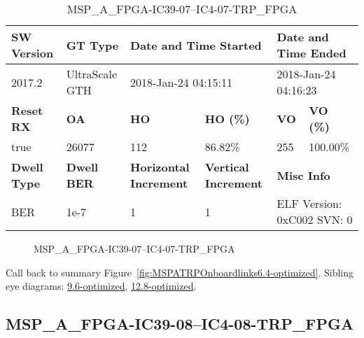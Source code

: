 \begin{table}[h]
\centering
\caption{MSP\_A\_FPGA-IC39-07--IC4-07-TRP\_FPGA}
\label{tab:MSPAFPGAIC3907IC407TRPFPGA6.4-optimized}
\begin{tabular}{@{}|l|l|l|l|l|l|@{}}
\toprule
\textbf{SW Version}                & \textbf{GT Type}   & \multicolumn{2}{l|}{\textbf{Date and Time Started}}            & \multicolumn{2}{l|}{\textbf{Date and Time Ended}}        \\ \midrule
2017.2                       & UltraScale GTH          & \multicolumn{2}{l|}{2018-Jan-24 04:15:11}                   & \multicolumn{2}{l|}{2018-Jan-24 04:16:23}               \\ \midrule
\textbf{Reset RX}                  & \textbf{OA} & \textbf{HO}   & \textbf{HO (\%)} & \textbf{VO} & \textbf{VO (\%)} \\ \midrule
true & 26077        & 112          & 86.82\%        & 255        & 100.00\%       \\ \midrule
\textbf{Dwell Type}                & \textbf{Dwell BER} & \textbf{Horizontal Increment} & \textbf{Vertical Increment}    & \multicolumn{2}{l|}{\textbf{Misc Info}}                  \\ \midrule
BER                            & 1e-7        & 1        & 1           & \multicolumn{2}{l|}{ELF Version: 0xC002 SVN: 0}                         \\ \bottomrule
\end{tabular}
\end{table}

\begin{figure}[h]
\caption{MSP\_A\_FPGA-IC39-07--IC4-07-TRP\_FPGA} \label{fig:MSPAFPGAIC3907IC407TRPFPGA6.4-optimized}
\end{figure}

Call back to summary Figure~\ref{fig:MSPATRPOnboardlinks6.4-optimized}.
Sibling eye diagrams: \hyperref[sec:MSPAFPGAIC3907IC407TRPFPGA9.6-optimized]{9.6-optimized}, \hyperref[sec:MSPAFPGAIC3907IC407TRPFPGA12.8-optimized]{12.8-optimized}.

\clearpage
\newpage


\subsection{MSP\_A\_FPGA-IC39-08--IC4-08-TRP\_FPGA}\label{sec:MSPAFPGAIC3908IC408TRPFPGA6.4-optimized}

